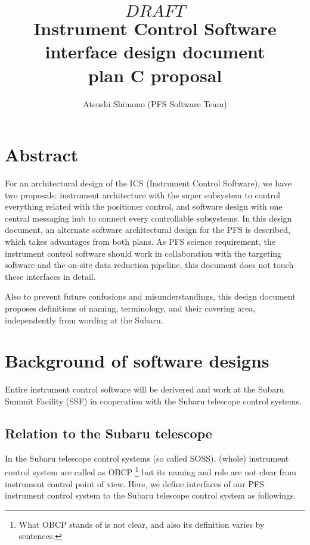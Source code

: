 \documentclass[a4paper,notitlepage]{article}
\title{\[DRAFT\] Instrument Control Software interface design document \\
    plan C proposal}
\author{Atsushi Shimono (PFS Software Team)}
\begin{document}
\maketitle
\tableofcontents

\section{Abstract}

For an architectural design of the ICS (Instrument Control Software), 
we have two proposals: instrument architecture with the super subsystem 
to control everything related with the positioner control, and software 
design with one central messaging hub to connect every controllable 
subsystems. 
In this design document, an alternate software architectural design for 
the PFS is described, which takes advantages from both plans. 
As PFS science requirement, the instrument control software should work 
in collaboration with the targeting software and the on-site data 
reduction pipeline, this document does not touch these interfaces in 
detail.

Also to prevent future confusions and misunderstandings, 
this design document proposes definitions of naming, terminology, and 
their covering area, independently from wording at the Subaru.


\section{Background of software designs}

Entire instrument control software will be derivered and work at the 
Subaru Summit Facility (SSF) in cooperation with the Subaru telescope 
control systems.

\subsection{Relation to the Subaru telescope}

In the Subaru telescope control systems (so called SOSS), (whole) instrument 
control system are called as OBCP
\footnote{What OBCP stands of is not clear, and also its definition varies 
by sentences.} but its naming and role are not clear from instrument 
control point of view.
Here, we define interfaces of our PFS instrument control system to the 
Subaru telescope control system as followings.
\end{document}
